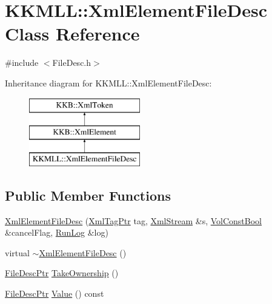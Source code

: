 \hypertarget{class_k_k_m_l_l_1_1_xml_element_file_desc}{}\section{K\+K\+M\+LL\+:\+:Xml\+Element\+File\+Desc Class Reference}
\label{class_k_k_m_l_l_1_1_xml_element_file_desc}


{\ttfamily \#include $<$File\+Desc.\+h$>$}

Inheritance diagram for K\+K\+M\+LL\+:\+:Xml\+Element\+File\+Desc\+:\begin{figure}[H]
\begin{center}
\leavevmode
\includegraphics[height=3.000000cm]{class_k_k_m_l_l_1_1_xml_element_file_desc}
\end{center}
\end{figure}
\subsection*{Public Member Functions}
\begin{DoxyCompactItemize}
\item 
\hyperlink{class_k_k_m_l_l_1_1_xml_element_file_desc_a603d47a98b90ac385a69d3543d3f044c}{Xml\+Element\+File\+Desc} (\hyperlink{namespace_k_k_b_a9253a3ea8a5da18ca82be4ca2b390ef0}{Xml\+Tag\+Ptr} tag, \hyperlink{class_k_k_b_1_1_xml_stream}{Xml\+Stream} \&s, \hyperlink{namespace_k_k_b_a7d390f568e2831fb76b86b56c87bf92f}{Vol\+Const\+Bool} \&cancel\+Flag, \hyperlink{class_k_k_b_1_1_run_log}{Run\+Log} \&log)
\item 
virtual \hyperlink{class_k_k_m_l_l_1_1_xml_element_file_desc_afe455e37c15dab92c81b50273e5448b6}{$\sim$\+Xml\+Element\+File\+Desc} ()
\item 
\hyperlink{namespace_k_k_m_l_l_aa0d0b6ab4ec18868a399b8455b05d914}{File\+Desc\+Ptr} \hyperlink{class_k_k_m_l_l_1_1_xml_element_file_desc_a184f63011eb522f70e5daec5d5f7e151}{Take\+Ownership} ()
\item 
\hyperlink{namespace_k_k_m_l_l_aa0d0b6ab4ec18868a399b8455b05d914}{File\+Desc\+Ptr} \hyperlink{class_k_k_m_l_l_1_1_xml_element_file_desc_aa5277742e64c63e316a7d18c614c5e7f}{Value} () const 
\end{DoxyCompactItemize}

